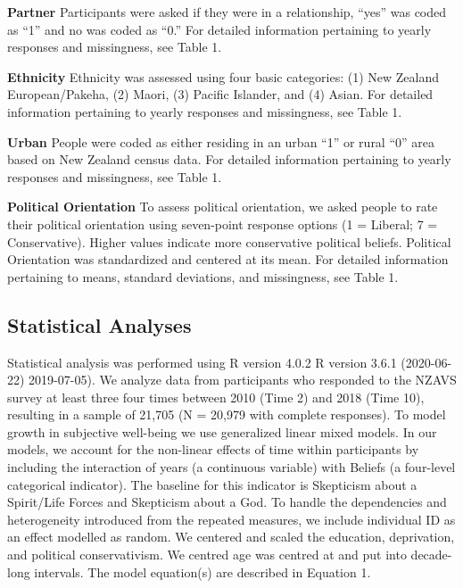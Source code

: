 \documentclass[
  english,
  man]{apa6}
\begin{document}
\textbf{Partner} Participants were asked if they were in a relationship, \enquote{yes} was coded as \enquote{1} and no was coded as \enquote{0.} For detailed information pertaining to yearly responses and missingness, see Table 1.

\textbf{Ethnicity} Ethnicity was assessed using four basic categories: (1) New Zealand European/Pakeha, (2) Maori, (3) Pacific Islander, and (4) Asian. For detailed information pertaining to yearly responses and missingness, see Table 1.

\textbf{Urban} People were coded as either residing in an urban \enquote{1} or rural \enquote{0} area based on New Zealand census data. For detailed information pertaining to yearly responses and missingness, see Table 1.

\textbf{Political Orientation} To assess political orientation, we asked people to rate their political orientation using seven-point response options (1 = Liberal; 7 = Conservative). Higher values indicate more conservative political beliefs. Political Orientation was standardized and centered at its mean. For detailed information pertaining to means, standard deviations, and missingness, see Table 1.

\hypertarget{statistical-analyses}{%
\subsection{Statistical Analyses}\label{statistical-analyses}}

Statistical analysis was performed using R version 4.0.2 R version 3.6.1 (2020-06-22) 2019-07-05). We analyze data from participants who responded to the NZAVS survey at least three four times between 2010 (Time 2) and 2018 (Time 10), resulting in a sample of 21,705 (N = 20,979 with complete responses). To model growth in subjective well-being we use generalized linear mixed models. In our models, we account for the non-linear effects of time within participants by including the interaction of years (a continuous variable) with Beliefs (a four-level categorical indicator). The baseline for this indicator is Skepticism about a Spirit/Life Forces and Skepticism about a God. To handle the dependencies and heterogeneity introduced from the repeated measures, we include individual ID as an effect modelled as random. We centered and scaled the education, deprivation, and political conservativism. We centred age was centred at and put into decade-long intervals.
The model equation(s) are described in Equation 1.
\end{document}
